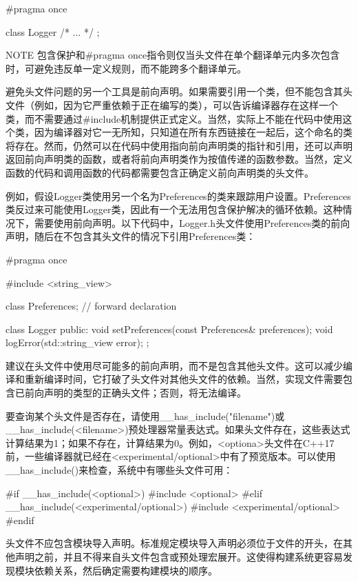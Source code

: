 \begin{cpp}
#pragma once

class Logger { /* ... */ };
\end{cpp}

\begin{myNotic}{NOTE}
包含保护和\#pragma once指令则仅当头文件在单个翻译单元内多次包含时，可避免违反单一定义规则，而不能跨多个翻译单元。
\end{myNotic}


避免头文件问题的另一个工具是前向声明。如果需要引用一个类，但不能包含其头文件（例如，因为它严重依赖于正在编写的类），可以告诉编译器存在这样一个类，而不需要通过\#include机制提供正式定义。当然，实际上不能在代码中使用这个类，因为编译器对它一无所知，只知道在所有东西链接在一起后，这个命名的类将存在。然而，仍然可以在代码中使用指向前向声明类的指针和引用，还可以声明返回前向声明类的函数，或者将前向声明类作为按值传递的函数参数。当然，定义函数的代码和调用函数的代码都需要包含正确定义前向声明类的头文件。

例如，假设Logger类使用另一个名为Preferences的类来跟踪用户设置。Preferences类反过来可能使用Logger类，因此有一个无法用包含保护解决的循环依赖。这种情况下，需要使用前向声明。以下代码中，Logger.h头文件使用Preferences类的前向声明，随后在不包含其头文件的情况下引用Preferences类：

\begin{cpp}
#pragma once

#include <string_view>

class Preferences; // forward declaration

class Logger
{
    public:
        void setPreferences(const Preferences& preferences);
        void logError(std::string_view error);
};
\end{cpp}

建议在头文件中使用尽可能多的前向声明，而不是包含其他头文件。这可以减少编译和重新编译时间，它打破了头文件对其他头文件的依赖。当然，实现文件需要包含已前向声明的类型的正确头文件；否则，将无法编译。


要查询某个头文件是否存在，请使用\_\_has\_include("filename")或\_\_has\_include(<filename>)预处理器常量表达式。如果头文件存在，这些表达式计算结果为1；如果不存在，计算结果为0。例如，<optiona>头文件在C++17前，一些编译器就已经在<experimental/optional>中有了预览版本。可以使用\_\_has\_include()来检查，系统中有哪些头文件可用：

\begin{cpp}
#if __has_include(<optional>)
    #include <optional>
#elif __has_include(<experimental/optional>)
    #include <experimental/optional>
#endif
\end{cpp}


头文件不应包含模块导入声明。标准规定模块导入声明必须位于文件的开头，在其他声明之前，并且不得来自头文件包含或预处理宏展开。这使得构建系统更容易发现模块依赖关系，然后确定需要构建模块的顺序。
















